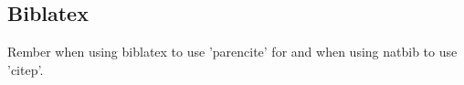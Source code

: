 \documentclass{article}
\newlength{\tblw}
\newlength{\figurewidth}
\newlength{\figureheight}
\begin{document}
%	
%
%	
%
%
%
%
%        
%        
%
%
%    

\subsection{Biblatex}
Rember when using biblatex to use 'parencite' for \citep{kamtheDataEfficient2018} and when using natbib to use 'citep'.

%
\end{document}
